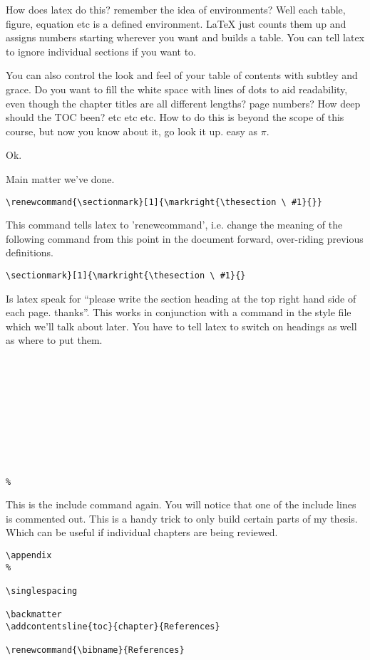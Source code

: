 How does latex do this?  remember the idea of environments?  Well each table, figure, equation etc is a defined environment.  LaTeX just counts them up and assigns numbers starting wherever you want and builds a table.  You can tell latex to ignore individual sections if you want to.

You can also control the look and feel of your table of contents with subtley and grace. Do you want to fill the white space with lines of dots to aid readability, even though the chapter titles are all different lengths? page numbers? How deep should the TOC been?  etc etc etc. How to do this is beyond the scope of this course, but now you know about it, go look it up. easy as $\pi$.

Ok.

Main matter we've done.

\begin{verbatim}
\renewcommand{\sectionmark}[1]{\markright{\thesection \ #1}{}}
\end{verbatim}

This command tells latex to 'renewcommand', i.e. change the meaning of the following command from this point in the document forward, over-riding previous definitions.
\begin{verbatim}
\sectionmark}[1]{\markright{\thesection \ #1}{}
\end{verbatim}

Is latex speak for ``please write the section heading at the top right hand side of each page. thanks''. This works in conjunction with a command in the style file which we'll talk about later. You have to tell latex to switch on headings as well as where to put them.

\begin{verbatim}










%
\end{verbatim}

This is the include command again. You will notice that one of the include lines is commented out. This is a handy trick to only build certain parts of my thesis. Which can be useful if individual chapters are being reviewed.

\pagebreak

\begin{verbatim}
\appendix
%

\singlespacing

\backmatter
\addcontentsline{toc}{chapter}{References}

\renewcommand{\bibname}{References}

\end{verbatim}

